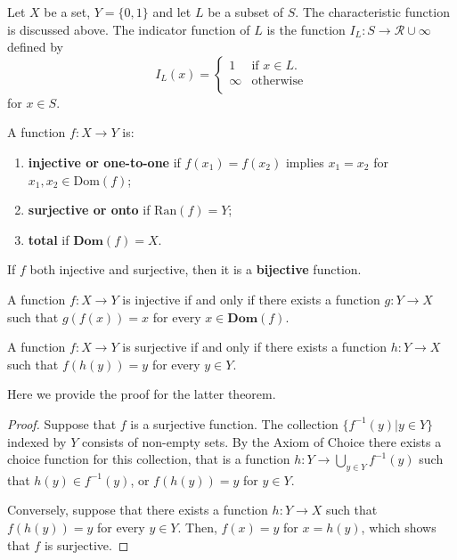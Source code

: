 \documentclass[../main.tex]{subfiles}
\begin{document}
\begin{purple}
\begin{definition}
Let $X$ be a set, $Y = \{0, 1\}$ and let $L$ be a subset of $S$. The characteristic function is discussed above. The indicator function of $L$ is the function $I_L: S\rightarrow \mathcal{R}\cup \infty$ defined by 
$$
I_L(x)=\begin{cases}
    1&\text{if }x\in L.\\
    \infty&\text{otherwise}\\
\end{cases}
$$
for $x\in S$.
\end{definition}
\end{purple}

\begin{purple}
\begin{definition}
A function $f: X\rightarrow Y$ is:
\begin{enumerate}
    \item \textbf{injective or one-to-one} if $f(x_1)=f(x_2)$ implies $x_1=x_2$ for $x_1, x_2\in \text{Dom}(f)$;
    \item \textbf{surjective or onto} if $\text{Ran}(f) = Y$;
    \item \textbf{total} if $\textbf{Dom}(f) = X$.
\end{enumerate}

If $f$ both injective and surjective, then it is a \textbf{bijective} function.
\end{definition}
\end{purple}

\begin{yellow}
\begin{theorem}
A function $f: X\rightarrow Y$ is injective if and only if there exists a function $g: Y\rightarrow X$ such that $g(f(x))=x$ for every $x\in \textbf{Dom}(f)$. 

A function $f: X\rightarrow Y$ is surjective if and only if there exists a function $h: Y\rightarrow X$ such that $f(h(y))=y$ for every $y\in Y$. 
\end{theorem}
\end{yellow}

Here we provide the proof for the latter theorem.

\begin{proof}
Suppose that $f$ is a surjective function. The collection $\{f^{-1}(y)|y\in Y\}$ indexed by $Y$ consists of non-empty sets. By the Axiom of Choice there exists a choice function for this collection, that is a function $h: Y\rightarrow \bigcup_{y\in Y}f^{-1}(y)$ such that $h(y)\in f^{-1}(y)$, or $f(h(y))=y$ for $y\in Y$.

Conversely, suppose that there exists a function $h: Y\rightarrow X$ such that $f(h(y))=y$ for every $y\in Y$. Then, $f(x)=y$ for $x=h(y)$, which shows that $f$ is surjective.
\end{proof}
\end{document}
